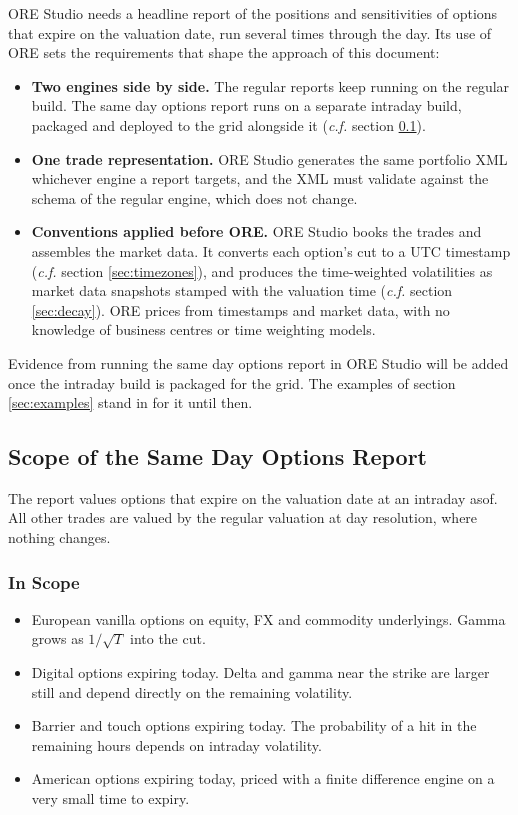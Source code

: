 \documentclass[12pt, a4paper]{article}
\begin{document}
ORE Studio needs a headline report of the positions and sensitivities of options that expire on the valuation date,
run several times through the day. Its use of ORE sets the requirements that shape the approach of this document:

\begin{itemize}
\item \textbf{Two engines side by side.} The regular reports keep running on the regular build. The same day options
  report runs on a separate intraday build, packaged and deployed to the grid alongside it (\textit{c.f.} section
  \ref{sec:scope}).
\item \textbf{One trade representation.} ORE Studio generates the same portfolio XML whichever engine a report targets,
  and the XML must validate against the schema of the regular engine, which does not change.
\item \textbf{Conventions applied before ORE.} ORE Studio books the trades and assembles the market data. It converts
  each option's cut to a UTC timestamp (\textit{c.f.} section \ref{sec:timezones}), and produces the time-weighted volatilities as market data
  snapshots stamped with the valuation time (\textit{c.f.} section \ref{sec:decay}). ORE prices from timestamps and market data, with
  no knowledge of business centres or time weighting models.
\end{itemize}

Evidence from running the same day options report in ORE Studio will be added once the intraday build is packaged for
the grid. The examples of section \ref{sec:examples} stand in for it until then.

\subsection{Scope of the Same Day Options Report}\label{sec:scope}

The report values options that expire on the valuation date at an intraday asof. All other trades are valued by the
regular valuation at day resolution, where nothing changes.

\subsubsection*{In Scope}

\begin{itemize}
\item European vanilla options on equity, FX and commodity underlyings. Gamma grows as $1/\sqrt{T}$ into the cut.
\item Digital options expiring today. Delta and gamma near the strike are larger still and depend directly on the
  remaining volatility.
\item Barrier and touch options expiring today. The probability of a hit in the remaining hours depends on intraday
  volatility.
\item American options expiring today, priced with a finite difference engine on a very small time to expiry.
\end{itemize}
\end{document}
